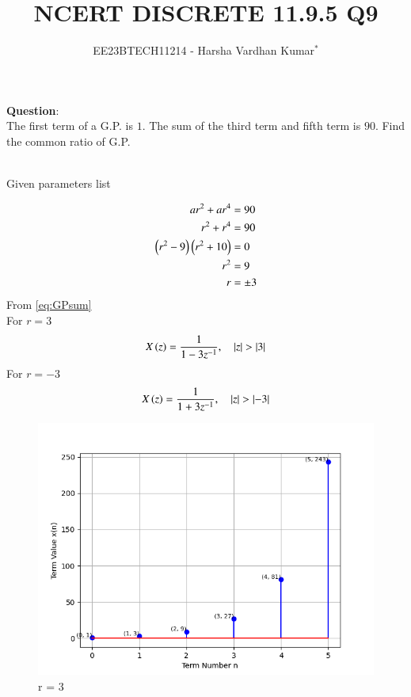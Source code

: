 \documentclass[journal,12pt,twocolumn]{IEEEtran}
\theoremstyle{remark}
\begin{document}

\vspace{3cm}
\title{NCERT DISCRETE 11.9.5 Q9}
\author{EE23BTECH11214 - Harsha Vardhan Kumar$^{*}$%
}
\maketitle
\newpage
\bigskip
\textbf{Question}:\\
The first term of a G.P. is $1$. The sum of the third term and fifth
term is $90$. Find the common ratio of G.P.
\\
\solution\\
\fi
\begin{table}[htbp]
\centering

\caption{Given parameters list}
\end{table}
\begin{align}
ar^2 + ar^4 &= 90 \\
r^2 + r^4 &= 90 \\
\left(r^2 - 9\right)\left(r^2 + 10\right) &= 0 \\
r^2 &= 9 \\
r &= \pm 3
\end{align}
From  \eqref{eq:GPsum} \\
For $r = 3$
\begin{align}
X\left(z\right) = \frac{1}{1 - 3z^{-1}}  , \quad \left\vert z\right\vert > \left\vert3\right\vert
\end{align}
For $r = -3$
\begin{align}
X\left(z\right) = \frac{1}{1 + 3z^{-1}}  , \quad \left\vert z\right\vert > \left\vert-3\right\vert
\end{align}
\begin{figure}
   \centering
     \includegraphics[width=1\columnwidth, height=1\columnwidth]{ncert-maths/11/9/5/9/figs/graph.png}
     \caption{r = 3}
\end{figure}
\end{document}
